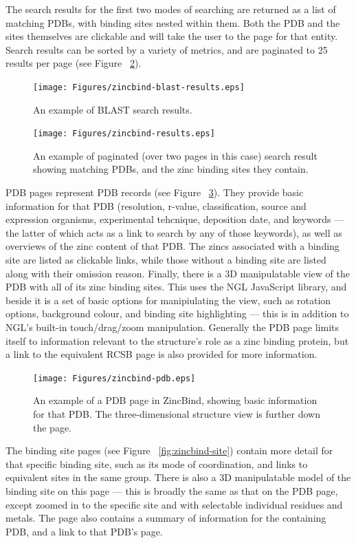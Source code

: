 The search results for the first two modes of searching are returned as a list of matching PDBs, with binding sites nested within them. Both the PDB and the sites themselves are clickable and will take the user to the page for that entity. Search results can be sorted by a variety of metrics, and are paginated to 25 results per page (see Figure ~\ref{fig:zincbind-results}).

\begin{figure}
\centering
\texttt{[image: Figures/zincbind-blast-results.eps]}
\caption{\label{fig:zincbind-blast-results} An example of BLAST search results.}
\end{figure}

\begin{figure}
\centering
\texttt{[image: Figures/zincbind-results.eps]}
\caption{\label{fig:zincbind-results} An example of paginated (over two pages
in this case) search result showing matching PDBs, and the zinc binding sites
they contain.}
\end{figure}

PDB pages represent PDB records (see Figure ~\ref{fig:zincbind-pdb}). They provide basic information for that PDB (resolution, r-value, classification, source and expression organisms, experimental tehcnique, deposition date, and keywords --- the latter of which acts as a link to search by any of those keywords), as well as overviews of the zinc content of that PDB. The zincs associated with a binding site are listed as clickable links, while those without a binding site are listed along with their omission reason. Finally, there is a 3D manipulatable view of the PDB with all of its zinc binding sites. This uses the NGL JavaScript library, and beside it is a set of basic options for manipiulating the view, such as rotation options, background colour, and binding site highlighting --- this is in addition to NGL's built-in touch/drag/zoom manipulation. Generally the PDB page limits itself to information relevant to the structure's role as a zinc binding protein, but a link to the equivalent RCSB page is also provided for more information.

\begin{figure}
\centering
\texttt{[image: Figures/zincbind-pdb.eps]}
\caption{\label{fig:zincbind-pdb} An example of a PDB page in ZincBind, showing basic
information for that PDB. The three-dimensional structure view is further down the page.}
\end{figure}

The binding site pages (see Figure ~\ref{fig:zincbind-site}) contain more detail for that specific binding site, such as its mode of coordination, and links to equivalent sites in the same group. There is also a 3D manipulatable model of the binding site on this page --- this is broadly the same as that on the PDB page, except zoomed in to the specific site and with selectable individual residues and metals. The page also contains a summary of information for the containing PDB, and a link to that PDB's page.

